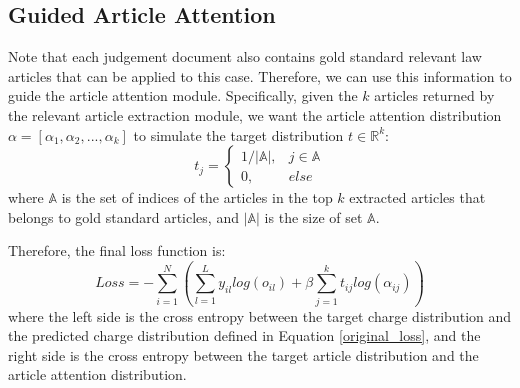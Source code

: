 \subsection{Guided Article Attention}
Note that each judgement document also contains gold standard relevant law articles that can be applied to this case. Therefore, we can use this information to guide the article attention module. Specifically, given the $k$ articles returned by the relevant article extraction module, we want the article attention distribution $\alpha=[\alpha_1, \alpha_2, ..., \alpha_k]$ to simulate the target distribution $t\in\mathbb{R}^k$:
\begin{equation}
t_j=
\begin{cases}
1/|\mathbb{A}|,	& j\in \mathbb{A}\\
0,	& else
\end{cases}
\end{equation}
where $\mathbb{A}$ is the set of indices of the articles in the top $k$ extracted articles that belongs to gold standard articles, and $|\mathbb{A}|$ is the size of set $\mathbb{A}$. 

Therefore, the final loss function is:
\begin{equation}
\label{final_loss}
Loss = -\sum_{i=1}^N(\sum_{l=1}^L{y_{il} log(o_{il})} + \beta \sum_{j=1}^k{t_{ij} log(\alpha_{ij})})
\end{equation}
where the left side is the cross entropy between the target charge distribution and the predicted charge distribution defined in Equation \ref{original_loss}, and the right side is the cross entropy between the target article distribution and the article attention distribution. 